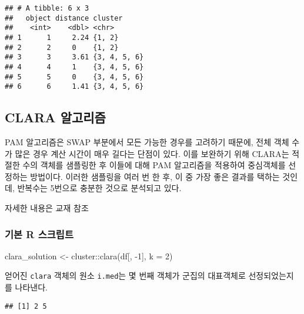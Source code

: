 \documentclass[
]{book}
\newenvironment{Shaded}{\begin{snugshade}}{\end{snugshade}}
\newcommand{\AttributeTok}[1]{\textcolor[rgb]{0.77,0.63,0.00}{#1}}
\newcommand{\DecValTok}[1]{\textcolor[rgb]{0.00,0.00,0.81}{#1}}
\newcommand{\FunctionTok}[1]{\textcolor[rgb]{0.00,0.00,0.00}{#1}}
\newcommand{\NormalTok}[1]{#1}
\newcommand{\OtherTok}[1]{\textcolor[rgb]{0.56,0.35,0.01}{#1}}
\newcommand{\SpecialCharTok}[1]{\textcolor[rgb]{0.00,0.00,0.00}{#1}}
\begin{document}
\begin{verbatim}
## # A tibble: 6 x 3
##   object distance cluster     
##    <int>    <dbl> <chr>       
## 1      1     2.24 {1, 2}      
## 2      2     0    {1, 2}      
## 3      3     3.61 {3, 4, 5, 6}
## 4      4     1    {3, 4, 5, 6}
## 5      5     0    {3, 4, 5, 6}
## 6      6     1.41 {3, 4, 5, 6}
\end{verbatim}

\hypertarget{clara}{%
\subsection{CLARA 알고리즘}\label{clara}}

PAM 알고리즘은 SWAP 부분에서 모든 가능한 경우를 고려하기 때문에, 전체 객체 수가 많은 경우 계산 시간이 매우 길다는 단점이 있다. 이를 보완하기 위해 CLARA는 적절한 수의 객체를 샘플링한 후 이들에 대해 PAM 알고리즘을 적용하여 중심객체를 선정하는 방법이다. 이러한 샘플링을 여러 번 한 후, 이 중 가장 좋은 결과를 택하는 것인데, 반복수는 5번으로 충분한 것으로 분석되고 있다.

자세한 내용은 교재 \citep{jun2012datamining} 참조

\hypertarget{clara-basic-script}{%
\subsubsection{기본 R 스크립트}\label{clara-basic-script}}

\begin{Shaded}
\begin{Highlighting}[]
\NormalTok{clara\_solution }\OtherTok{\textless{}{-}}\NormalTok{ cluster}\SpecialCharTok{::}\FunctionTok{clara}\NormalTok{(df[, }\SpecialCharTok{{-}}\DecValTok{1}\NormalTok{], }\AttributeTok{k =} \DecValTok{2}\NormalTok{)}
\end{Highlighting}
\end{Shaded}

얻어진 \texttt{clara} 객체의 원소 \texttt{i.med}는 몇 번째 객체가 군집의 대표객체로 선정되었는지를 나타낸다.

\begin{Shaded}
\end{Shaded}

\begin{verbatim}
## [1] 2 5
\end{verbatim}
\end{document}
